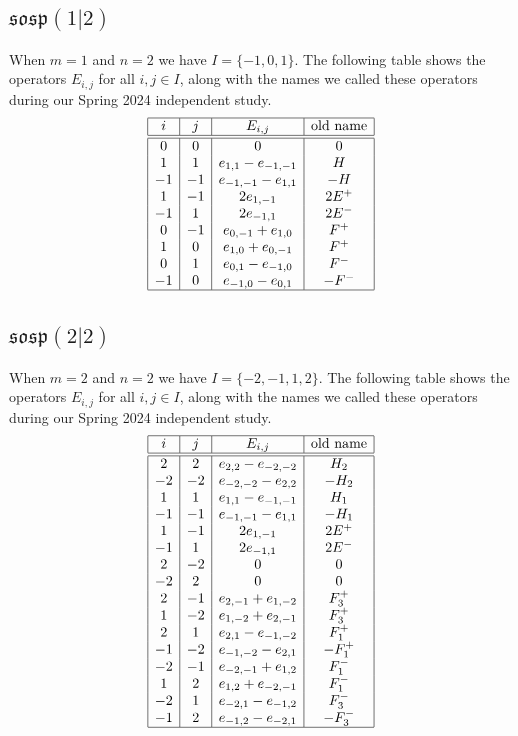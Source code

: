 \documentclass{amsart}
\begin{document}
\subsection{$\mathfrak{sosp}(1|2)$} 
When $m=1$ and $n=2$ we have $I=\{-1, 0, 1\}$. The following table shows the operators $E_{i,j}$ for all $i, j\in I$, along with the names we called these operators during our Spring 2024 independent study. 
\[\begin{array}{|c|c|c|c|}
\hline
i & j & E_{i,j} & \text{old name}\\
\hline
\hline
0 &  0 & 0                & 0\\
1 &  1 & e_{1,1}-e_{-1,-1}& H\\
-1& -1 & e_{-1,-1}-e_{1,1}& -H\\
1 & -1 & 2e_{1,-1}        & 2E^+\\
-1&  1 & 2e_{-1,1}        & 2E^-\\
0 & -1 & e_{0,-1}+e_{1,0} & F^+\\
1 &  0 & e_{1,0}+e_{0,-1} & F^+\\
0 &  1 & e_{0,1}-e_{-1,0} & F^-\\
-1&  0 & e_{-1,0}-e_{0,1} & -F^-\\
\hline
\end{array}\]

\subsection{$\mathfrak{sosp}(2|2)$} 
When $m=2$ and $n=2$ we have $I=\{-2,-1, 1, 2\}$. The following table shows the operators $E_{i,j}$ for all $i, j\in I$, along with the names we called these operators during our Spring 2024 independent study. 
\[\begin{array}{|c|c|c|c|}
\hline
i & j & E_{i,j} & \text{old name}\\
\hline
\hline
2 &  2 & e_{2,2}-e_{-2,-2}& H_2\\
-2& -2 & e_{-2,-2}-e_{2,2}& -H_2\\
1 &  1 & e_{1,1}-e_{-1,-1}& H_1\\
-1& -1 & e_{-1,-1}-e_{1,1}& -H_1\\
1 & -1 & 2e_{1,-1}        & 2E^+\\
-1&  1 & 2e_{-1,1}        & 2E^-\\
2 & -2 & 0 & 0\\
-2&  2 & 0 & 0\\
2 & -1 & e_{2,-1}+e_{1,-2} & F_3^+\\
1 & -2 & e_{1,-2}+e_{2,-1} & F_3^+\\
2 &  1 & e_{2,1}-e_{-1,-2} & F_1^+\\
-1& -2 & e_{-1,-2}-e_{2,1} & -F_1^+\\
-2& -1 & e_{-2,-1}+e_{1,2} & F_1^-\\
1 &  2 & e_{1,2}+e_{-2,-1} & F_1^-\\
-2&  1 & e_{-2,1}-e_{-1,2} & F_3^-\\
-1&  2 & e_{-1,2}-e_{-2,1} & -F_3^-\\
\hline
\end{array}\]
\end{document}
